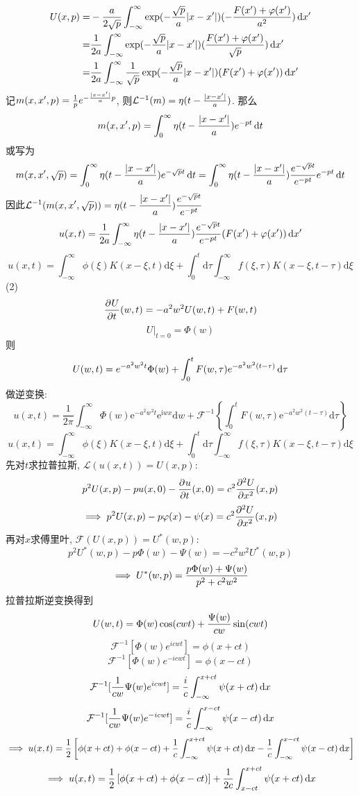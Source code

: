 \documentclass[UTF8,9pt]{ctexart}
\begin{document}
$$\ar{
    \dis U(x,p) =&\dis -\f{a}{2\sqrt{p}}\int_{-\infty}^{\infty} \exp(-\f{\sqrt{p}}{a}|x-x'|)(-\f{F(x')+\vp(x')}{a^2})\d x'\\
    =&\dis     \f{1}{2a}\int_{-\infty}^{\infty} \exp(-\f{\sqrt{p}}{a}|x-x'|)(\f{F(x')+\vp(x')}{\sqrt{p}})\d x'\\
    =&\dis   \f{1}{2a}\int_{-\infty}^{\infty} \ff{\sqrt{p}}\exp(-\f{\sqrt{p}}{a}|x-x'|)(F(x')+\vp(x'))\d x'\\
}$$
记$m(x,x',p)=\ff{p}e^{-\f{|x-x'|}{a}p}$, 则$\mathcal{L}^{-1}(m) = \eta(t - \f{|x-x'|}{a})$. 那么
$$m(x,x',p) = \int_0^{\infty}\eta(t - \f{|x-x'|}{a})e^{-pt}\d t$$
或写为
$$m(x,x',\sqrt{p}) = \int_0^{\infty}\eta(t - \f{|x-x'|}{a})e^{-\sqrt{p}t}\d t = \int_0^{\infty}\eta(t - \f{|x-x'|}{a})\f{e^{-\sqrt{p}t}}{e^{-pt}}e^{-pt}\d t$$
因此$\dis\mathcal{L}^{-1}(m(x,x',\sqrt{p})) = \eta(t - \f{|x-x'|}{a})\f{e^{-\sqrt{p}t}}{e^{-pt}}$
$$u(x,t) = \f{1}{2a}\int_{-\infty}^{\infty} \eta(t - \f{|x-x'|}{a})\f{e^{-\sqrt{p}t}}{e^{-pt}}(F(x')+\vp(x'))\d x'$$
$$ 
u(x, t)=\int_{-\infty}^{\infty} \phi(\xi) K(x-\xi, t) \mathrm{d} \xi+\int_{0}^{t} \mathrm{d} \tau \int_{-\infty}^{\infty} f(\xi, \tau) K(x-\xi, t-\tau) \mathrm{d} \xi
 $$
 \newpage
(2)
$$\pp{U}{t}(w,t) = -a^2w^2 U(w,t) +F(w,t)$$
$$U|_{t=0} = \Phi(w)$$
则$$U(w,t)=e^{-a^2w^2t}\Phi(w)+\int_0^t F(w,\tau)e^{-a^2w^2(t-\tau)}\d \tau$$
做逆变换: 
$$ 
u(x, t)=\frac{1}{2 \pi} \int_{-\infty}^{\infty} \Phi(w ) \mathrm{e}^{-a^{2} w ^{2} t} \mathrm{e}^{\mathrm{i} w  x} \mathrm{d} w +\mathcal{F}^{-1}\left\{\int_{0}^{t} F(w , \tau) \mathrm{e}^{-a^{2} w ^{2}(t-\tau)} \mathrm{d} \tau\right\}
 $$
 $$ 
 u(x, t)=\int_{-\infty}^{\infty} \phi(\xi) K(x-\xi, t) \mathrm{d} \xi+\int_{0}^{t} \mathrm{d} \tau \int_{-\infty}^{\infty} f(\xi, \tau) K(x-\xi, t-\tau) \mathrm{d} \xi
  $$
  \newpage
{}
先对$t$求拉普拉斯, $\mathcal{L}(u(x,t))=U(x,p)$:
$$p^2U(x,p)-pu(x,0)-\pp{u}{t}(x,0) = c^2\pp[2]{U}{x}(x,p)$$
$$\ip p^2U(x,p)-p\vp(x)-\psi(x) = c^2\pp[2]{U}{x}(x,p)$$
再对$x$求傅里叶, $\mathcal{F}(U(x,p))=U^*(w,p)$: 
$$p^2U^*(w,p) - p\Phi(w)-\Psi(w)=-c^2w^2U^*(w,p)$$
$$\ip U^*(w,p) = \f{p\Phi(w)+\Psi(w)}{p^2+c^2w^2}$$
拉普拉斯逆变换得到
$$U(w,t)=\Phi(w)\cos(cwt)+\f{\Psi(w)}{cw}\sin(cwt)$$
$$\mathcal{F}^{-1}[\Phi(w)e^{icwt}] = \phi(x+ct)$$
$$\mathcal{F}^{-1}[\Phi(w)e^{-icwt}] = \phi(x-ct)$$
$$\mathcal{F}^{-1}[\ff{cw}\Psi(w)e^{icwt}] =\f{i}{c} \int_{-\infty}^{x+ct}\psi(x+ct)\d x$$
$$\mathcal{F}^{-1}[\ff{cw}\Psi(w)e^{-icwt}] =\f{i}{c} \int_{-\infty}^{x-ct}\psi(x-ct)\d x$$
$$\ip u(x,t) = \ff{2}\left[\phi(x+ct)+ \phi(x-ct) + \f{1}{c} \int_{-\infty}^{x+ct}\psi(x+ct)\d x-\f{1}{c} \int_{-\infty}^{x-ct}\psi(x-ct)\d x\right]$$
$$\ip u(x,t) = \ff{2}\left[\phi(x+ct)+ \phi(x-ct)\right] + \ff{2c}\int_{x-ct}^{x+ct}\psi(x+ct)\d x$$
\end{document}
